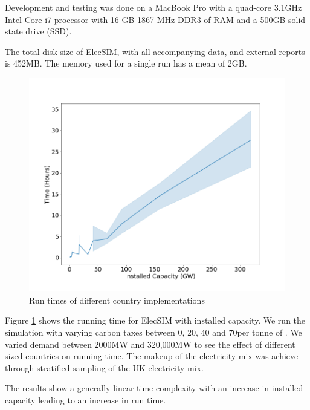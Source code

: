 Development and testing was done on a MacBook Pro with a quad-core 3.1GHz Intel Core i7 processor with 16 GB 1867 MHz DDR3 of RAM and a 500GB solid state drive (SSD).

The total disk size of ElecSIM, with all accompanying data, and external reports is 452MB. The memory used for a single run has a mean of 2GB.



\begin{figure}[h]
	\centering
	\includegraphics[width=1\linewidth]{figures/timing_plot}
	\caption{Run times of different country implementations}
	\label{fig:timingplot}
\end{figure}

Figure \ref{fig:timingplot} shows the running time for ElecSIM with installed capacity. We run the simulation with varying carbon taxes between 0, 20, 40 and 70\textsterling per tonne of . We varied demand between 2000MW and 320,000MW to see the effect of different sized countries on running time. The makeup of the electricity mix was achieve through stratified sampling of the UK electricity mix. 

The results show a generally linear time complexity with an increase in installed capacity leading to an increase in run time.

